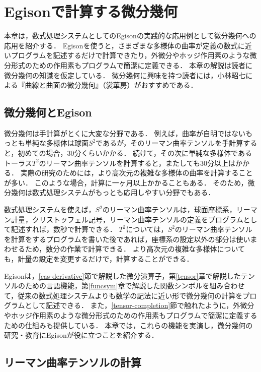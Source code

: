 \chapter{Egisonで計算する微分幾何}\label{diffgeo}

本章は，数式処理システムとしてのEgisonの実践的な応用例として微分幾何への応用を紹介する．
Egisonを使うと，さまざまな多様体の曲率が定義の数式に近いプログラムを記述するだけで計算できたり，外微分やホッジ作用素のような微分形式のための作用素もプログラムで簡潔に定義できる．
本章の解説は読者に微分幾何の知識を仮定している．
微分幾何に興味を持つ読者には，小林昭七による『曲線と曲面の微分幾何』（裳華房）がおすすめである．

\section{微分幾何とEgison}

微分幾何は手計算がとくに大変な分野である．
例えば，曲率が自明ではないもっとも単純な多様体は球面$S^2$であるが，そのリーマン曲率テンソルを手計算すると，初めての場合，30分くらいかかる．
続けて，その次に単純な多様体であるトーラス$T^2$のリーマン曲率テンソルを計算すると，またしても30分以上はかかる．
実際の研究のためには，より高次元の複雑な多様体の曲率を計算することが多い．
このような場合，計算に一ヶ月以上かかることもある．
そのため，微分幾何は数式処理システムがもっとも応用しやすい分野でもある．

数式処理システムを使えば，$S^2$のリーマン曲率テンソルは，球面座標系，リーマン計量，クリストッフェル記号，リーマン曲率テンソルの定義をプログラムとして記述すれば，数秒で計算できる．
$T^2$については，$S^2$のリーマン曲率テンソルを計算をするプログラムを書いた後であれば，座標系の設定以外の部分は使いまわせるため，数分の作業で計算できる．
より高次元の複雑な多様体についても，計量の設定を変更するだけで，計算することができる．

Egisonは，\ref{cas-derivative}節で解説した微分演算子，第\ref{tensor}章で解説したテンソルのための言語機能，第\ref{funcsym}章で解説した関数シンボルを組み合わせて，従来の数式処理システムよりも数学の記法に近い形で微分幾何の計算をプログラムとして記述できる．
また，\ref{tensor-completion}節で触れたように，外微分やホッジ作用素のような微分形式のための作用素もプログラムで簡潔に定義するための仕組みも提供している．
本章では，これらの機能を実演し，微分幾何の研究・教育にEgisonが役に立つことを紹介する．

\section{リーマン曲率テンソルの計算}\label{diffgeo-riemann}

